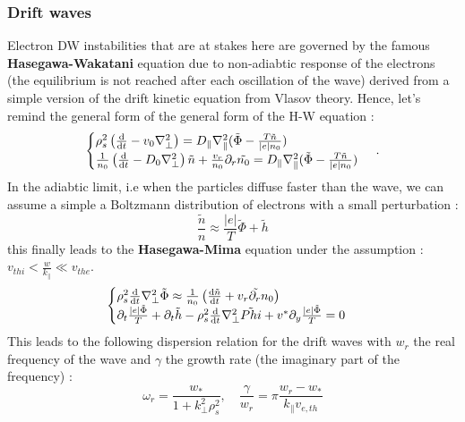 \documentclass[11pt,a4paper]{report}
\begin{document}
\begin{multicols}{2}
    \subsubsection{Drift waves}
    Electron  DW instabilities that are at stakes here are governed by the famous \textbf{Hasegawa-Wakatani} equation due to non-adiabtic response of the electrons (the equilibrium is not reached after each oscillation of the wave) derived from a simple version of the drift kinetic equation from Vlasov theory. Hence, let's remind the general form of the general form of the H-W equation :
    \begin{equation}
        \begin{cases}
            \rho_s^2 \left(
            \dv{t} - v_0\nabla_\perp^2 \right) = D_\parallel\nabla_\parallel^2(\tilde{\Phi} - \frac{T\tilde{n}}{|e|n_0}) \\
            \frac{1}{n_0}\left(\dv{t} - D_0\nabla_\perp^2\right)\tilde{n} + \frac{v_r}{n_0}\partial_r\tilde{n_0} = D_\parallel\nabla_\parallel^2(\tilde{\Phi} - \frac{T\tilde{n}}{|e|n_0})
        \end{cases}\,.
    \end{equation}
    In the adiabtic limit, i.e when the particles diffuse faster than the wave, we can assume a simple a Boltzmann distribution of electrons with a small perturbation :
    $$\frac{\tilde{n}}{n} \approx \frac{\vert e \vert}{T} \tilde{\Phi} + \tilde{h}$$ this finally leads to the \textbf{Hasegawa-Mima} equation under the assumption : $ v_{thi} <\frac{w}{k_\parallel} \ll v_{the}$.
    \begin{equation}
        \begin{cases}
            \rho_s^2\dv{t}\nabla_\perp^2\tilde{\Phi} \approx \frac{1}{n_0}\left(\dv{\tilde{n}}{t} + \tilde{v_r\partial_r n_0}\right) \\
            \partial_t \frac{\vert e \vert \tilde{\Phi}}{T} + \partial_t \tilde{h} - \rho_s^2\dv{t}\nabla_\perp^2\tilde{Phi}  + v^{*}\partial_y\frac{\vert e \vert \tilde{\Phi}}{T} = 0
        \end{cases}
    \end{equation}
    This leads to the following dispersion relation for the drift waves with $w_r$ the real frequency of the wave and $\gamma$ the growth rate (the imaginary part of the frequency) :
    $$\omega_r = \frac{w_{*}}{1 + k_\perp^2\rho_s^2}, \quad \frac{\gamma}{w_r} = \pi \frac{w_r - w_{*}}{k_\parallel v_{e,th}}$$


\end{multicols}
\end{document}
